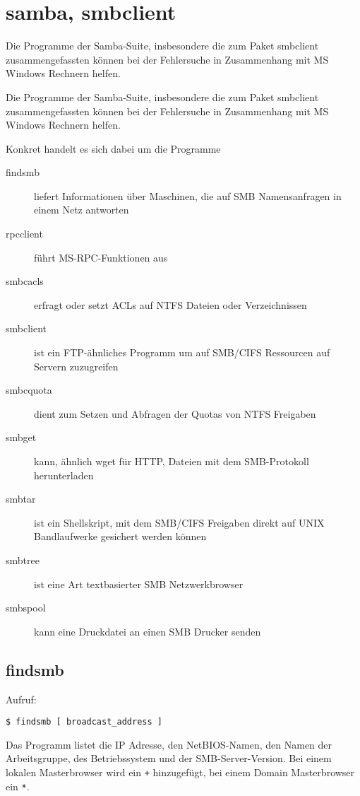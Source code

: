 \section{samba, smbclient}
\label{sec:netz-werkzeuge-smbclient}
\begin{abstractsec}
  Die Programme der Samba-Suite, insbesondere die zum Paket smbclient
  zusammengefassten können bei der Fehlersuche in Zusammenhang mit MS Windows
  Rechnern helfen.
\end{abstractsec}
\begin{normaltext}
  Die Programme der Samba-Suite, insbesondere die zum Paket smbclient
  zusammengefassten können bei der Fehlersuche in Zusammenhang mit MS Windows
  Rechnern helfen.

  Konkret handelt es sich dabei um die Programme
  \begin{description}
    \item[findsmb] liefert Informationen über Maschinen, die auf SMB
      Namensanfragen in einem Netz antworten
    \item[rpcclient] führt MS-RPC-Funktionen aus
    \item[smbcacls] erfragt oder setzt ACLs auf NTFS Dateien oder
      Verzeichnissen
    \item[smbclient] ist ein FTP-ähnliches Programm um auf SMB/CIFS Ressourcen
      auf Servern zuzugreifen
    \item[smbcquota] dient zum Setzen und Abfragen der Quotas von NTFS 
      Freigaben
    \item[smbget] kann, ähnlich wget für HTTP, Dateien mit dem SMB-Protokoll
      herunterladen
    \item[smbtar] ist ein Shellskript, mit dem SMB/CIFS Freigaben direkt auf
      UNIX Bandlaufwerke gesichert werden können
    \item[smbtree] ist eine Art textbasierter SMB Netzwerkbrowser
    \item[smbspool] kann eine Druckdatei an einen SMB Drucker senden
  \end{description}
  \subsection*{findsmb}
  Aufruf:
  \begin{verbatim}
$ findsmb [ broadcast_address ]
  \end{verbatim}
  Das Programm listet die IP Adresse, den NetBIOS-Namen, den Namen der
  Arbeitsgruppe, des Betriebssystem und der SMB-Server-Version. Bei einem
  lokalen Masterbrowser wird ein \verb?+? hinzugefügt, bei einem Domain
  Masterbrowser ein \verb?*?.


\end{normaltext}
